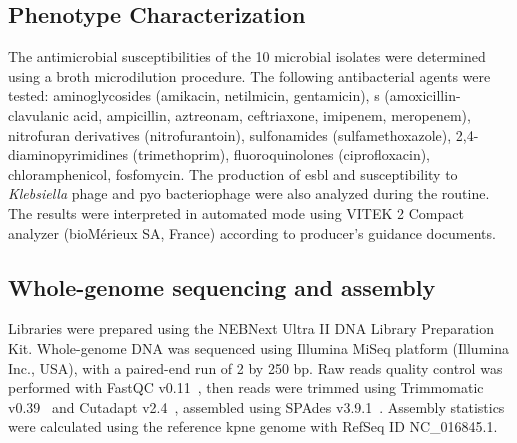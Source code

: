 \subsection{Phenotype Characterization}\label{subsec:phe}
The antimicrobial susceptibilities of the 10 microbial isolates were determined using a broth microdilution procedure.
The following antibacterial agents were tested: aminoglycosides (amikacin, netilmicin, gentamicin),
\betalactam s (amoxicillin-clavulanic acid, ampicillin, aztreonam, ceftriaxone, imipenem, meropenem),
nitrofuran derivatives (nitrofurantoin), sulfonamides (sulfamethoxazole), 2,4-diaminopyrimidines (trimethoprim),
fluoroquinolones (ciprofloxacin), chloramphenicol, fosfomycin.
The production of \gls{esbl} and susceptibility to \textit{Klebsiella} phage and pyo bacteriophage
were also analyzed during the routine.
The results were interpreted in automated mode using VITEK 2 Compact analyzer (bioMérieux SA, France) according to
producer's guidance documents.

\subsection{Whole-genome sequencing and assembly}\label{subsec:proc_raw}
Libraries were prepared using the NEBNext Ultra II DNA Library Preparation Kit.
Whole-genome DNA was sequenced using Illumina MiSeq platform (Illumina Inc., USA),
with a paired-end run of 2 by 250 bp.
Raw reads quality control was performed with FastQC v0.11~\cite{FastQC},  %
then reads were trimmed using Trimmomatic v0.39~\cite{Trimmomatic}
and Cutadapt v2.4~\cite{Cutadapt},
assembled using SPAdes v3.9.1~\cite{SPAdes}.
Assembly statistics were calculated using the reference \gls{kpne} genome with RefSeq ID NC\_016845.1.

